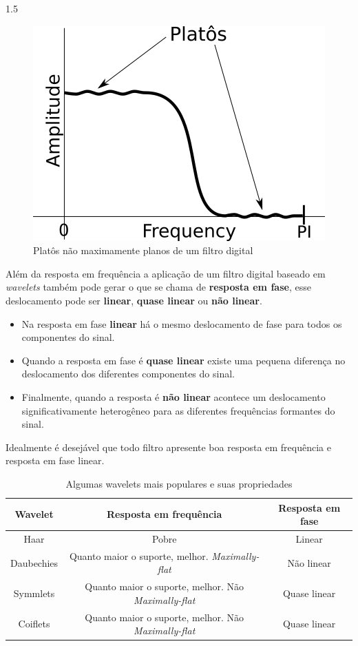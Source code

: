 \documentclass[a4paper,12pt,openright,oneside]{book}
\newenvironment{myenv}[1]
  {\begin{spacing}{#1}}
  {\end{spacing}}
\begin{document}
\begin{myenv}{1.5}
					\begin{figure}[h]
						\centering
						\includegraphics[width=0.3\linewidth]{images/noMaximallyFlat}
						\caption{Platôs não maximamente planos de um filtro digital}
						\label{fig:nomaximallyflat}
					\end{figure}
				
					\par Além da resposta em frequência a aplicação de um filtro digital baseado em \textit{wavelets} também pode gerar o que se chama de \textbf{resposta em fase}, esse deslocamento pode ser \textbf{linear}, \textbf{quase linear} ou \textbf{não linear}. 
					
					\begin{itemize}
						\item Na resposta em fase \textbf{linear} há o mesmo deslocamento de fase para todos os componentes do sinal.
						\item Quando a resposta em fase é \textbf{quase linear} existe uma pequena diferença no deslocamento dos diferentes componentes do sinal.
						\item Finalmente, quando a resposta é \textbf{não linear} acontece um deslocamento significativamente heterogêneo para as diferentes frequências formantes do sinal.
 					\end{itemize}
					
					\par Idealmente é desejável que todo filtro apresente boa resposta em frequência e resposta em fase linear.
					
					\begin{table}[h]
						\centering
						\begin{tabular}{|c|c|c|}
								\hline 
								\textbf{Wavelet} & \textbf{Resposta em frequência} & \textbf{Resposta em fase} \\ 
								\hline 
								Haar & Pobre &  Linear \\ 
								\hline 
								Daubechies & Quanto maior o suporte, melhor. \textit{Maximally-flat}  &  Não linear \\ 
								\hline 
								Symmlets & Quanto maior o suporte, melhor. Não \textit{Maximally-flat} & Quase linear \\ 
								\hline 
								Coiflets & Quanto maior o suporte, melhor. Não \textit{Maximally-flat} & Quase linear \\ 
								\hline 
						\end{tabular} 
						\caption{Algumas wavelets mais populares e suas propriedades}
						\label{tab:waveletsProperties}
					\end{table}
				

\end{myenv}
\end{document}
